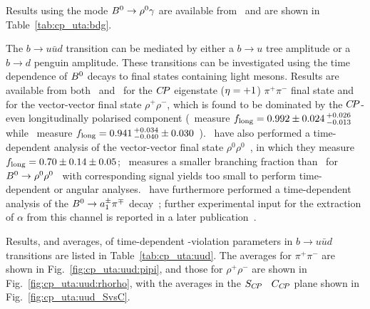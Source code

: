 Results using the mode $B^0 \to \rho^0\gamma$ are available from 
\belle\ and are shown in Table~\ref{tab:cp_uta:bdg}.



\clearpage
{}
\label{sec:cp_uta:uud}

The $b \to u \bar u d$ transition can be mediated by either 
a $b \to u$ tree amplitude or a $b \to d$ penguin amplitude.
These transitions can be investigated using 
the time dependence of $B^0$ decays to final states containing light mesons.
Results are available from both \babar\ and \belle\ for the 
$C\!P$ eigenstate (${\eta} = +1$) $\pi^+\pi^-$ final state
and for the vector-vector final state $\rho^+\rho^-$,
which is found to be dominated by the $C\!P$-even
longitudinally polarised component
(\babar\ measure $f_{\rm long} = 
0.992 \pm 0.024 \, ^{+0.026}_{-0.013}$~\cite{Aubert:2007nua}
while \belle\ measure $f_{\rm long} = 
0.941 \, ^{+0.034}_{-0.040} \pm 0.030$~\cite{Somov:2006sg}).
\babar\ have also performed a time-dependent analysis of the 
vector-vector final state $\rho^0\rho^0$~\cite{:2008iha},
in which they measure  $f_{\rm long} = 0.70 \pm 0.14 \pm 0.05$;
\belle\ measures a smaller branching fraction than \babar\ for
$B^0\to\rho^0\rho^0$~\cite{:2008et} with corresponding signal yields too small
to perform time-dependent or angular analyses.
\babar\ have furthermore performed a time-dependent analysis of the 
$B^0 \to a_1^\pm \pi^\mp$ decay~\cite{Aubert:2006gb}; further experimental
input for the extraction of $\alpha$ from this channel is reported in a later
publication~\cite{:2009ii}.

Results, and averages, of time-dependent \CP-violation parameters in 
$b \to u \bar u d$ transitions are listed in Table~\ref{tab:cp_uta:uud}.
The averages for $\pi^+\pi^-$ are shown in Fig.~\ref{fig:cp_uta:uud:pipi},
and those for $\rho^+\rho^-$ are shown in Fig.~\ref{fig:cp_uta:uud:rhorho},
with the averages in the $S_{C\!P}$ \vs\ $C_{C\!P}$ plane 
shown in Fig.~\ref{fig:cp_uta:uud_SvsC}.



